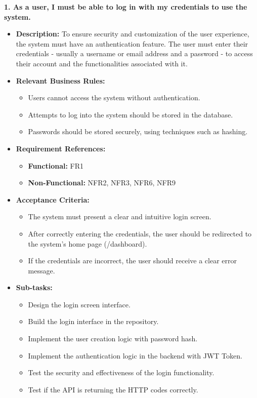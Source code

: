 \textbf{1. As a user, I must be able to log in with my credentials to use the system.}
\begin{itemize}
    \item \textbf{Description:} To ensure security and customization of the user experience, the system must have an authentication feature. The user must enter their credentials - usually a username or email address and a password - to access their account and the functionalities associated with it.
    \item \textbf{Relevant Business Rules:} 
        \begin{itemize}
            \item Users cannot access the system without authentication.
            \item Attempts to log into the system should be stored in the database.
            \item Passwords should be stored securely, using techniques such as hashing.
        \end{itemize}

    \item \textbf{Requirement References:}
        \begin{itemize}
            \item \textbf{Functional:} FR1
            \item \textbf{Non-Functional:} NFR2, NFR3, NFR6, NFR9 
        \end{itemize}

    \item \textbf{Acceptance Criteria:}
        \begin{itemize}
            \item The system must present a clear and intuitive login screen.
            \item After correctly entering the credentials, the user should be redirected to the system's home page (/dashboard).
            \item If the credentials are incorrect, the user should receive a clear error message.
        \end{itemize}

        \item \textbf{Sub-tasks:}
            \begin{itemize}
                \item Design the login screen interface.
                \item Build the login interface in the repository.
                \item Implement the user creation logic with password hash.
                \item Implement the authentication logic in the backend with \gls{JWT} Token.
                \item Test the security and effectiveness of the login functionality.
                \item Test if the \gls{API} is returning the \gls{HTTP} codes correctly.
            \end{itemize}

\end{itemize}



